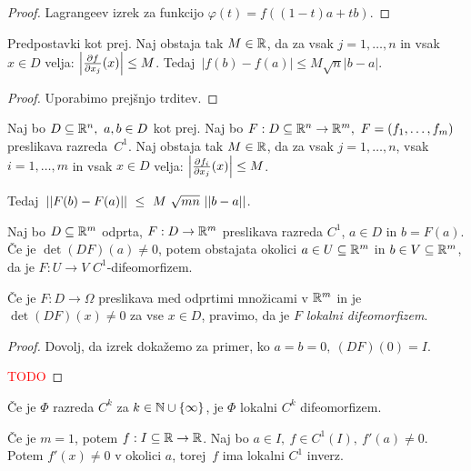 \begin{proof}
    Lagrangeev izrek za funkcijo $\varphi(t) = f((1-t)a + tb)$.
\end{proof}

\begin{lema}
    Predpostavki kot prej. Naj obstaja tak $M \in \mathbb{R}$, da za vsak $j = 1, \ldots, n$ in vsak $x \in D$ velja: $\left|\frac{\partial f}{\partial x_j}(x)\right| \leq M$. Tedaj~$|f(b)-f(a)| \leq M \sqrt{n}|b-a|$.
\end{lema}

\begin{proof}
    Uporabimo prejšnjo trditev.
\end{proof}

\begin{lema}
    Naj bo $D \subseteq \mathbb{R}^n, \ a,b \in D$ kot prej. Naj bo $F: D \subseteq \mathbb{R}^n \to \mathbb{R}^m, \ F = (f_1, \ldots, f_m)$ preslikava razreda~$C^1$. Naj obstaja tak $M \in \mathbb{R}$, da za vsak $j = 1, \ldots, n$, vsak $i = 1, \ldots, m$ in vsak $x \in D$ velja: $\left|\frac{\partial f_i}{\partial x_j}(x)\right| \leq M$. 
    
    Tedaj~$||F(b) - F(a)||~\leq~M~\sqrt{mn}~||b - a||$.
\end{lema}

\begin{izrek}
    Naj bo $D \subseteq \mathbb{R}^m$ odprta, $F: D \to \mathbb{R}^m$ preslikava razreda $C^1$,  $a \in D$ in $b = F(a)$.
    Če je $\det(DF)(a) \neq 0$, potem obstajata okolici $a \in U \subseteq \mathbb{R}^m$ in $b \in V \subseteq \mathbb{R}^m$, da je $F: U \to V$ $C^1$-difeomorfizem.    
\end{izrek}

\begin{definicija}
    Če je $F: D \to \Omega$ preslikava med odprtimi množicami v $\mathbb{R}^m$ in je $\det(DF)(x) \neq 0$ za vse $x \in D$, pravimo, da je $F$ \emph{lokalni difeomorfizem}.
\end{definicija}

\begin{proof}
    Dovolj, da izrek dokažemo za primer, ko $a=b=0, \ (DF)(0) = I$.

    \textcolor{red}{TODO}
\end{proof}

\begin{posledica}
    Če je $\Phi$ razreda $C^k$ za $k \in \mathbb{N} \cup \left\{\infty\right\}$, je $\Phi$ lokalni $C^k$ difeomorfizem.
\end{posledica}

\begin{opomba}
    Če je $m=1$, potem $f: I \subseteq \mathbb{R} \to \mathbb{R}$. Naj bo $a \in I, \ f \in C^1(I), \ f'(a) \neq 0$. Potem $f'(x) \neq 0$ v okolici $a$, torej~$f$ ima lokalni $C^1$ inverz.
\end{opomba}

